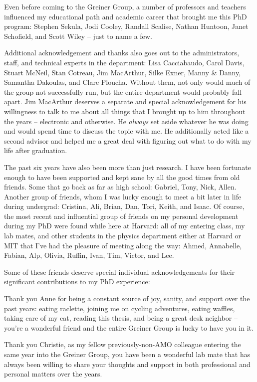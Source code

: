 Even before coming to the Greiner Group, a number of professors and teachers influenced my educational path and academic career that brought me this PhD program: Stephen Sekula, Jodi Cooley, Randall Scalise, Nathan Huntoon, Janet Schofield, and Scott Wiley -- just to name a few.

Additional acknowledgement and thanks also goes out to the administrators, staff, and technical experts in the department: Lisa Cacciabaudo, Carol Davis, Stuart McNeil, Stan Cotreau, Jim MacArthur, Silke Exner, Manny \& Danny, Samantha Dakoulas, and Clare Ploucha. Without them, not only would much of the group not successfully run, but the entire department would probably fall apart. Jim MacArthur deserves a separate and special acknowledgement for his willingness to talk to me about all things that I brought up to him throughout the years -- electronic and otherwise. He \emph{always} set aside whatever he was doing and would spend time to discuss the topic with me. He additionally acted like a second advisor and helped me a great deal with figuring out what to do with my life after graduation.

The past six years have also been more than just research. I have been fortunate enough to have been supported and kept sane by all the good times from old friends. Some that go back as far as high school:  Gabriel, Tony, Nick, Allen. Another group of friends, whom I was lucky enough to meet a bit later in life during undergrad: Cristina, Ali, Brian, Dan, Tori, Keith, and Isaac. Of course, the most recent and influential group of friends on my personal development during my PhD were found while here at Harvard: all of my entering class, my lab mates, and other students in the physics department either at Harvard or MIT that I've had the pleasure of meeting along the way: Ahmed, Annabelle, Fabian, Alp, Olivia, Ruffin, Ivan, Tim, Victor, and Lee.

Some of these friends deserve special individual acknowledgements for their significant contributions to my PhD experience:

Thank you Anne for being a constant source of joy, sanity, and support over the past years: eating raclette, joining me on cycling adventures, eating waffles, taking care of my cat, reading this thesis, and being a great desk neighbor -- you're a wonderful friend and the entire Greiner Group is lucky to have you in it.

Thank you Christie, as my fellow previously-non-AMO colleague entering the same year into the Greiner Group, you have been a wonderful lab mate that has always been willing to share your thoughts and support in both professional and personal matters over the years. 

